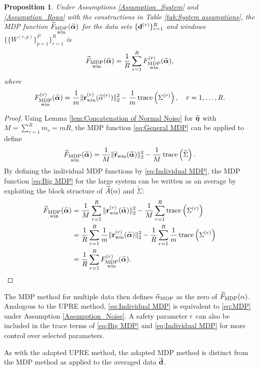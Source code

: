 \documentclass[12pt]{article}
\newtheorem{proposition}{Proposition}[section]
\begin{document}
\begin{proposition}
\label{prop:Main MDP Result}
Under Assumptions \ref{Assumption_System} and \ref{Assumption_Rows} with the constructions in Table \ref{tab:System assumptions}, the MDP function $\widetilde{F}_{\substack{\text{MDP} \\ \text{win}}}(\widetilde{\bm{\alpha}})$ for the data sets $\{\mathbf{d}^{(r)}\}_{r=1}^R$ and windows $\{\{W^{(r,p)}\}_{p=1}^P\}_{r=1}^R$ is
\begin{equation}
\label{eq:Averaged MDP}
\widetilde{F}_{\substack{\text{MDP} \\ \text{win}}}(\widetilde{\bm{\alpha}}) = \frac{1}{R} \sum_{r=1}^R F_{\substack{\text{MDP} \\ \text{win}}}^{(r)}(\widetilde{\bm{\alpha}}),
\end{equation}
where
\begin{equation}
\label{eq:Individual MDP}
F_{\substack{\text{MDP} \\ \text{win}}}^{(r)}(\widetilde{\bm{\alpha}}) = \frac{1}{m}\|\mathbf{r}_{\text{win}}^{(r)}(\widetilde{\alpha}^{(r)})\|_2^2 - \frac{1}{m}\operatorname{trace}\left(\Sigma^{(r)}\right), \quad r = 1,\ldots,R.
\end{equation}
\end{proposition}
\begin{proof}
Using Lemma \ref{lem:Concatenation of Normal Noise} for $\widetilde{\bm{\eta}}$ with $M = \sum_{r=1}^{R} m_r = mR$, the MDP function \eqref{eq:General MDP} can be applied to define
\begin{equation}
\label{eq:Big MDP}
\widetilde{F}_{\substack{\text{MDP} \\ \text{win}}}(\widetilde{\bm{\alpha}}) = \frac{1}{M}\|\widetilde{\mathbf{r}}_{\text{win}}(\widetilde{\bm{\alpha}})\|_2^2 - \frac{1}{M}\operatorname{trace}\left(\widetilde{\Sigma}\right).
\end{equation}
By defining the individual MDP functions by \eqref{eq:Individual MDP}, the MDP function \eqref{eq:Big MDP} for the large system can be written as an average by exploiting the block structure of $\widetilde{A}(\alpha)$ and $\widetilde{\Sigma}$:
\begin{align*}
\widetilde{F}_{\substack{\text{MDP} \\ \text{win}}}(\widetilde{\bm{\alpha}}) &= \frac{1}{M}\sum_{r=1}^R \|\mathbf{r}_{\text{win}}^{(r)}(\widetilde{\bm{\alpha}})\|_2^2 - \frac{1}{M}\sum_{r=1}^R \operatorname{trace}\left(\Sigma^{(r)}\right) \nonumber \\
&= \frac{1}{R}\sum_{r=1}^R \frac{1}{m}\|\mathbf{r}_{\text{win}}^{(r)}(\widetilde{\bm{\alpha}})\|_2^2 - \frac{1}{R}\sum_{r=1}^R \frac{1}{m}\operatorname{trace}\left(\Sigma^{(r)}\right) \nonumber \\
&= \frac{1}{R}\sum_{r=1}^R F_{\substack{\text{MDP} \\ \text{win}}}^{(r)}(\widetilde{\bm{\alpha}}).
\end{align*}
\end{proof}
\noindent The MDP method for multiple data then defines $\widetilde{\alpha}_{\textrm{MDP}}$ as the zero of $\widetilde{F}_{\text{MDP}}(\alpha)$. Analogous to the UPRE method, \eqref{eq:Individual MDP} is equivalent to \eqref{eq:MDP} under Assumption \ref{Assumption_Noise}. A safety parameter $\epsilon$ can also be included in the trace terms of \eqref{eq:Big MDP} and \eqref{eq:Individual MDP} for more control over selected parameters. \par 
As with the adapted UPRE method, the adapted MDP method is distinct from the MDP method as applied to the averaged data $\overline{\mathbf{d}}$.
\end{document}
